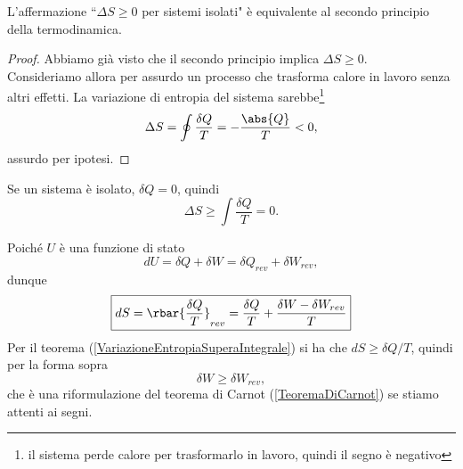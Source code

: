 \begin{proposition}
L'affermazione ``$\Delta S\geq 0$ per sistemi isolati" \`e equivalente al secondo principio della termodinamica.
\end{proposition}
\begin{proof}
Abbiamo gi\`a visto che il secondo principio implica $\Delta S\geq 0$.\\
Consideriamo allora per assurdo un processo che trasforma calore in lavoro senza altri effetti. 
La variazione di entropia del sistema sarebbe\footnote{il sistema perde calore per trasformarlo in lavoro, quindi il segno \`e negativo} 
\[\Delta S=\oint \frac{\delta Q}T=-\frac{\abs{Q}}T<0,\]
assurdo per ipotesi.
\end{proof}

\begin{remark}
Se un sistema \`e isolato, $\delta Q=0$, quindi \[\Delta S\geq \int \frac{\delta Q}T=0.\]
\end{remark}

\begin{remark}
Poich\'e $U$ \`e una funzione di stato
\[dU=\delta Q+\delta W=\delta Q_{rev}+\delta W_{rev},\]
dunque
\[\boxed{dS=\rbar{\frac{\delta Q}T}_{rev}=\frac{\delta Q}T+\frac{\delta W-\delta W_{rev}}T}\]
Per il teorema (\ref{VariazioneEntropiaSuperaIntegrale}) si ha che $dS\geq \delta Q/T$, quindi per la forma sopra
\[\delta W\geq \delta W_{rev},\]
che \`e una riformulazione del teorema di Carnot (\ref{TeoremaDiCarnot}) se stiamo attenti ai segni.
\end{remark}
